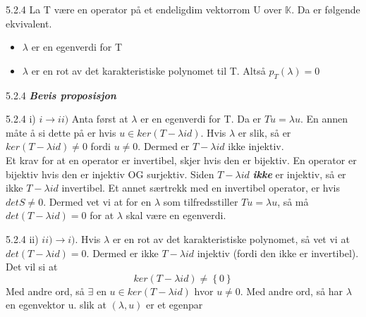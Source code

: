 \documentclass[a4paper,norsk]{article}
\begin{document}
\begin{propositionbox}{5.2.4}{}
La T være en operator på et endeligdim vektorrom U over $ \mathbb{K} $. Da er følgende ekvivalent. 

\begin{itemize}
    \item $ \lambda  $ er en egenverdi for T
    \item $ \lambda  $ er en rot av det karakteristiske polynomet til T. Altså $ p_T( \lambda ) =0 $  
\end{itemize}
\end{propositionbox}

\begin{oppgavebox}{5.2.4}{}
\textbf{\textit{Bevis proposisjon }}

\begin{proofbox}{5.2.4 i)}{}
$ i \rightarrow ii) $ Anta først at $ \lambda  $ er en egenverdi for T. Da er $ Tu = \lambda u $. En annen måte å si dette på er hvis $ u \in ker \left( T - \lambda id \right)  $. Hvis $ \lambda  $ er slik, så er $ ker \left( T - \lambda id \right) \neq 0  $ fordi $ u \neq 0 $. Dermed er $ T - \lambda id $ ikke injektiv.\\

Et krav for at en operator er invertibel, skjer hvis den er bijektiv. En operator er bijektiv hvis den er injektiv OG surjektiv. Siden $ T - \lambda id $  \textbf{\textit{ikke}} er injektiv, så er ikke $ T - \lambda id $  invertibel. Et annet særtrekk med en invertibel operator, er hvis $ det S \neq 0 $. Dermed vet vi at for en $ \lambda  $ som tilfredsstiller $ Tu= \lambda u $, så må $ det \left( T - \lambda id \right) =0 $ for at $ \lambda  $ skal være en egenverdi. 
\end{proofbox}

\begin{proofbox}{5.2.4 ii)}{}
$ ii) \rightarrow i) $.  Hvis $ \lambda  $ er en rot av det karakteristiske polynomet, så vet vi at $ det \left(  T - \lambda id \right) = 0 $. Dermed er ikke $ T - \lambda id $ injektiv (fordi den ikke er invertibel). Det vil si at 
\[
    ker \left( T - \lambda id \right) \neq \left\{ 0 \right\} 
\]
Med andre ord, så $ \exists $ en $ u \in ker \left( T - \lambda id \right)  $ hvor $ u \neq 0 $. Med andre ord, så har $ \lambda  $ en egenvektor u. slik at $ \left( \lambda , u \right)  $    er et egenpar
\end{proofbox}
\end{oppgavebox}
\end{document}
